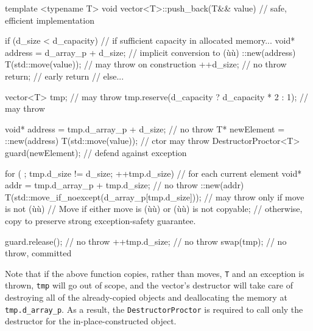\begin{emcppslisting}
template <typename T>
void vector<T>::push_back(T&& value)  // safe, efficient implementation
{
    if (d_size < d_capacity)  // if sufficient capacity in allocated memory...
    {
        void* address = d_array_p + d_size;  // implicit conversion to (ù{}ù)
        ::new(address) T(std::move(value));  // may throw on construction
        ++d_size;                            // no throw
        return;                              // early return
    }                                        // else...

    vector<T> tmp;                                 // may throw
    tmp.reserve(d_capacity ? d_capacity * 2 : 1);  // may throw

    void* address = tmp.d_array_p + d_size;              // no throw
    T* newElement = ::new(address) T(std::move(value));  // ctor may throw
    DestructorProctor<T> guard(newElement);        // defend against exception

    for ( ; tmp.d_size != d_size; ++tmp.d_size)    // for each current element
    {
        void* addr = tmp.d_array_p + tmp.d_size;   // no throw
        ::new(addr) T(std::move_if_noexcept(d_array_p[tmp.d_size]));
            // may throw only if move is not (ù{}ù)
            // Move if either move is (ù{}ù) or (ù{}ù) is not copyable;
            // otherwise, copy to preserve strong exception-safety guarantee.
    }

    guard.release();  // no throw
    ++tmp.d_size;     // no throw
    swap(tmp);        // no throw, committed
}
\end{emcppslisting}
    

\noindent Note that if the above function copies, rather than moves, \lstinline!T!
and an exception is thrown, \lstinline!tmp! will go out of scope, and the
vector's destructor will take care of destroying all of the
already-copied objects and deallocating the memory at
\lstinline!tmp.d_array_p!. As a result, the \lstinline!DestructorProctor! is
required to call only the destructor for the in-place-constructed
object.

